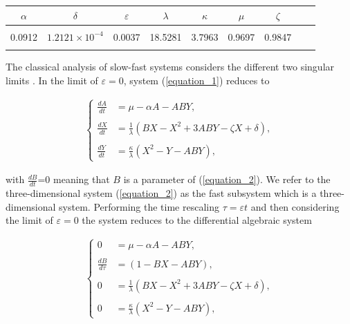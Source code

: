 \documentclass{ws-ijbc}
\begin{document}
\begin{table}[h]
{\begin{tabular}{c  c  c  c  c  c  c  c  c} \\[-2pt]
\toprule
$\alpha$ & $\delta$ & $\varepsilon$ & $\lambda$ & $\kappa$ & $\mu$ & $\zeta$ \\[6pt]
\hline\\[-2pt]
0.0912 & $1.2121 \times 10^{-4}$ & 0.0037 & 18.5281 & 3.7963 & 0.9697 & 0.9847\\[1pt]
\botrule
\end{tabular}}
\end{table}
    
The classical analysis of slow-fast systems considers the different two singular limits \cite{MMO}.  In the limit of $\varepsilon = 0$, system (\ref{equation_1}) reduces to
    
\begin{equation}
\begin{aligned}
\begin{cases}
\frac{dA}{dt} &= \mu - \alpha A - ABY, \\ \\
\frac{dX}{dt} &= \frac{1}{\lambda}(BX - X^2 +3ABY - \zeta X + \delta), \\ \\
\frac{dY}{dt} &= \frac{\kappa}{\lambda}(X^2 - Y - ABY),
\end{cases}
\end{aligned}
\label{equation_2}
\end{equation}
    
\noindent
with $\frac{dB}{dt}$=0 meaning that $B$ is a parameter of (\ref{equation_2}).  We refer to the three-dimensional system (\ref{equation_2}) as the fast subsystem which is a three-dimensional system.  Performing the time rescaling $\tau = \varepsilon t$ and then considering the limit of $\varepsilon = 0$ the system reduces to the differential algebraic system
    
 \begin{equation}
\begin{aligned}
\begin{cases}
0 &= \mu - \alpha A - ABY, \\ \\
\frac{dB}{d\tau} &= (1-BX - ABY), \\ \\
0 &= \frac{1}{\lambda}(BX - X^2 +3ABY - \zeta X + \delta), \\ \\
0 &= \frac{\kappa}{\lambda}(X^2 - Y - ABY),
\end{cases}
\end{aligned}
\label{equation_3}
\end{equation}
    
\end{document}
